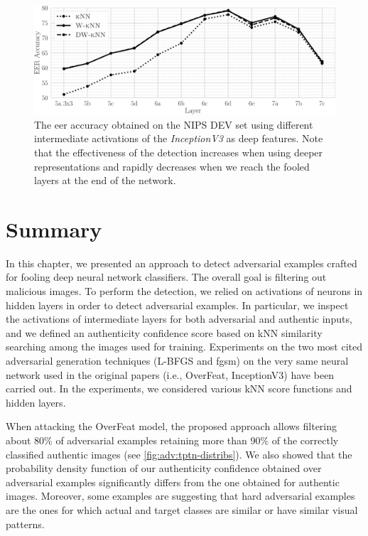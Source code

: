 \begin{figure}
\centering
\includegraphics[width=\columnwidth]{incepv3-eer-acc}
\caption{The \acrlong{eer} accuracy obtained on the NIPS DEV set using different intermediate activations of the \emph{InceptionV3} as deep features.
Note that the effectiveness of the detection increases when using deeper representations and rapidly decreases when we reach the fooled layers at the end of the network.}
\label{fig:adv:i3-eer}
\end{figure}


\section{Summary}
\label{sec:adv:conclusions}

In this chapter, we presented an approach to detect adversarial examples crafted for fooling deep neural network classifiers.
The overall goal is filtering out malicious images.
To perform the detection, we relied on activations of neurons in hidden layers in order to detect adversarial examples.
In particular, we inspect the activations of intermediate layers for both adversarial and authentic inputs, and we defined an authenticity confidence score based on kNN similarity searching among the images used for training.
Experiments on the two most cited adversarial generation techniques (L-BFGS and \gls{fgsm}) on the very same neural network used in the original papers (i.e., OverFeat, InceptionV3) have been carried out.
In the experiments, we considered various kNN score functions and hidden layers.


When attacking the OverFeat model, the proposed approach allows filtering about 80\% of adversarial examples retaining more than 90\% of the correctly classified authentic images (see \ref{fig:adv:tptn-distribs}).
We also showed that the probability density function of our authenticity confidence obtained over adversarial examples significantly differs from the one obtained for authentic images.
Moreover, some examples are suggesting that hard adversarial examples are the ones for which actual and target classes are similar or have similar visual patterns. %

